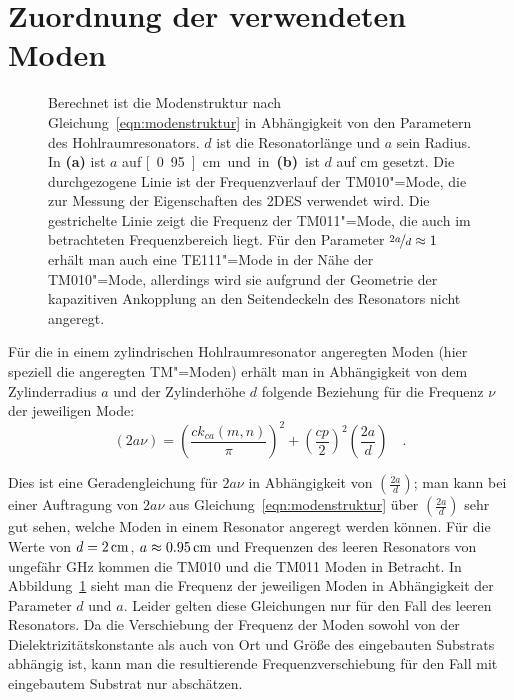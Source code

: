 \section{Zuordnung der verwendeten Moden}
\label{sec:resonatormodes}
\begin{figure}[h!tbp]
	\centerline{%
	}
	\caption[Modenstruktur des \HR s]{Berechnet ist die Modenstruktur nach Gleichung~\eqref{eqn:modenstruktur} in Abhängigkeit von den Parametern des Hohlraumresonators. $d$ ist die Resonatorlänge und $a$ sein Radius. In {\bfseries (a)} ist $a$ auf \unit[0.95]{cm} und in {\bfseries (b)} ist $d$ auf \unit[2]{cm} gesetzt. Die durchgezogene Linie ist der Frequenzverlauf der TM010"=Mode, die zur Messung der Eigenschaften des 2DES verwendet wird. Die gestrichelte Linie zeigt die Frequenz der TM011"=Mode, die auch im betrachteten Frequenzbereich liegt. Für den Parameter $\nicefrac{2a}{d}\approx1$ erhält man auch eine TE111"=Mode in der Nähe der TM010"=Mode, allerdings wird sie aufgrund der Geometrie der kapazitiven Ankopplung an den Seitendeckeln des Resonators nicht angeregt.}
	\label{fig:modeplot}
\end{figure}

Für die in einem zylindrischen Hohlraumresonator angeregten Moden (hier speziell die angeregten TM"=Moden) erhält man in Abhängigkeit von dem Zylinderradius $a$ und der Zylinderhöhe $d$ folgende Beziehung für die Frequenz $\nu$ der jeweiligen Mode:
\begin{equation}
	\label{eqn:modenstruktur}
	\left(2 a \nu\right)=\left(\frac{c k_{ca}(m,n)}{\pi}\right)^2+\left(\frac{c p}{2}\right)^2 \left(\frac{2a}{d}\right)\quad.
\end{equation}

Dies ist eine Geradengleichung für $2 a \nu$ in Abhängigkeit von $\left(\frac{2 a}{d}\right)$; man kann bei einer Auftragung von $2 a \nu$ aus Gleichung~\eqref{eqn:modenstruktur} über $\left(\frac{2 a}{d}\right)$ sehr gut sehen, welche Moden in einem Resonator angeregt werden können.
Für die Werte von $d=\unit[2]{cm}$, $a\approx\unit[0.95]{cm}$ und Frequenzen des leeren Resonators von ungefähr \unit[12]{GHz} kommen die TM010 und die TM011 Moden in Betracht. In Abbildung~\ref{fig:modeplot} sieht man die Frequenz der jeweiligen Moden in Abhängigkeit der Parameter $d$ und $a$. Leider gelten diese Gleichungen nur für den Fall des leeren Resonators. Da die Verschiebung der Frequenz der Moden sowohl von der Dielektrizitätskonstante als auch von Ort und Größe des eingebauten Substrats abhängig ist, kann man die resultierende Frequenzverschiebung für den Fall mit eingebautem Substrat nur abschätzen.

